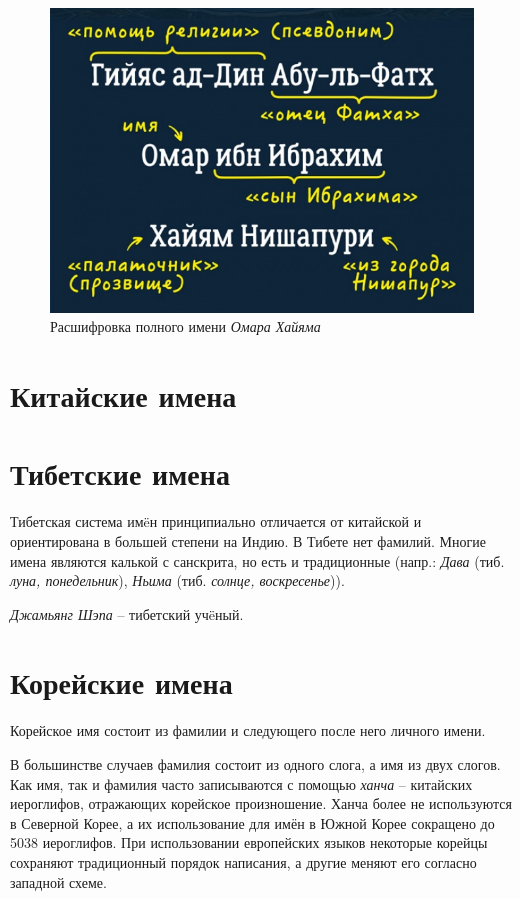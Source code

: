 \begin{figure}
    \centering
    \includegraphics[width=0.7\linewidth]{img/haiyam}
    \caption{Расшифровка полного имени \emph{Омара Хайяма}}
    \label{fig:haiyam}
\end{figure}

\section{Китайские имена}

\section{Тибетские имена}

Тибетская система им\"eн принципиально отличается от китайской и ориентирована в большей степени на Индию. В Тибете нет фамилий. Многие имена являются калькой с санскрита, но есть и традиционные (напр.: \emph{Дава} (тиб. \emph{луна, понедельник}), \emph{Ньима} (тиб. \emph{солнце, воскресенье})).

\emph{Джамьянг Шэпа} -- тибетский уч\"eный.

\section{Корейские имена}

Корейское имя состоит из фамилии и следующего после него личного имени.

В большинстве случаев фамилия состоит из одного слога, а имя из двух слогов. Как имя, так и фамилия часто записываются с помощью \emph{ханча} -- китайских иероглифов, отражающих корейское произношение. Ханча более не используются в Северной Корее, а их использование для имён в Южной Корее сокращено до 5038 иероглифов. При использовании европейских языков некоторые корейцы сохраняют традиционный порядок написания, а другие меняют его согласно западной схеме.

